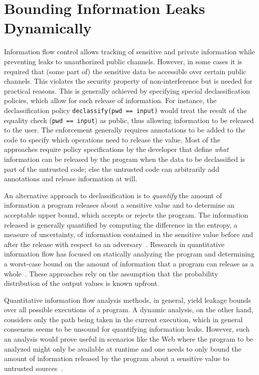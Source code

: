 \chapter{Bounding Information Leaks Dynamically}
\label{ch:lir}

Information flow control allows tracking of sensitive and private
information while preventing leaks to unauthorized public 
channels. However, in some cases it is required that (some part of) 
the sensitive data be accessible over certain public channels. This
violates the security property of non-interference but is needed for  
practical reasons. This is generally achieved by specifying special
declassification policies, which allow for such release of
information. For instance, the declassification policy 
\lstinline{declassify(pwd == input)} would treat the result of the
equality check (\lstinline{pwd == input})  as public, thus allowing
information to be released to the user. The enforcement generally
requires  annotations to be added to the code to
specify which operations need to release the value. Most of the
approaches require policy specifications by the developer that define
\emph{what} information can be released by the program when the data
to be declassified is part of the untrusted code; else the untrusted
code can arbitrarily add  annotations and release
information at will. 

An alternative approach to declassification is to \emph{quantify} the
amount of information a program releases about a sensitive value and
to determine an acceptable upper bound, which accepts or rejects the
program. The information released is generally quantified by computing
the difference in the entropy, a measure of uncertainty, of
information contained in the sensitive value before and after the
release with respect to an adversary~\cite{shannon, guessing,
  smith2009, clarkson2009, csf12GLeakage}. Research in quantitative
information flow has focused on statically analyzing the program
and determining a worst-case bound on the amount of information that a
program can release as a whole~\cite{denning82, clark, clarkson2009,
  smith2009, backes, kopf}. These approaches rely on the assumption
that the probability distribution of the output values is known 
upfront. 

Quantitative information flow analysis methods, in general, yield
leakage bounds over all possible executions of a program. A dynamic
analysis, on the other hand, considers only the path being taken in
the current execution, which in general consensus seems to be unsound
for quantifying information leaks. However, such an analysis would prove
useful in scenarios like the Web where the program to be analyzed
might only be available at runtime and one needs to only bound the
amount of information released by the program about a sensitive value
to untrusted sources~\cite{bielovaPLAS}. 

